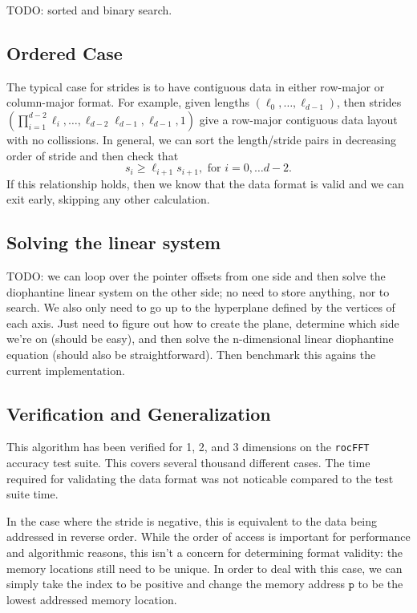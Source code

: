 \documentclass[twocolumn,10pt,notitlepage]{article}
\begin{document}


TODO: sorted and binary search.

\subsection{Ordered Case}

The typical case for strides is to have contiguous data in either
row-major or column-major format.  For example, given lengths
$\left(\ell_0,\dots,\ell_{d-1}\right)$, then strides
$\left(\prod_{i=1}^{d-2}\ell_i,\dots{},\ell_{d-2}\ell_{d-1},\ell_{d-1},1\right)$
give a row-major contiguous data layout with no collissions.  In
general, we can sort the length/stride pairs in decreasing order of
stride and then check that
\begin{equation}
  s_i \geq{} \ell_{i+1} s_{i+1}, \text{ for } i = 0,\dots{}d-2.
\end{equation}
If this relationship holds, then we know that the data format is valid
and we can exit early, skipping any other calculation.

\subsection{Solving the linear system}

TODO: we can loop over the pointer offsets from one side and then
solve the diophantine linear system on the other side; no need to
store anything, nor to search.  We also only need to go up to the
hyperplane defined by the vertices of each axis.  Just need to figure
out how to create the plane, determine which side we're on (should be
easy), and then solve the n-dimensional linear diophantine equation
(should also be straightforward).  Then benchmark this agains the
current implementation.

\subsection{Verification and Generalization}

This algorithm has been verified for 1, 2, and 3 dimensions on the
\texttt{rocFFT} accuracy test suite.  This covers several thousand
different cases.  The time required for validating the data format
was not noticable compared to the test suite time.

In the case where the stride is negative, this is equivalent to the
data being addressed in reverse order.  While the order of access is
important for performance and algorithmic reasons, this isn't a
concern for determining format validity: the memory locations still
need to be unique.  In order to deal with this case, we can simply
take the index to be positive and change the memory address
$\texttt{p}$ to be the lowest addressed memory location.
\end{document}
